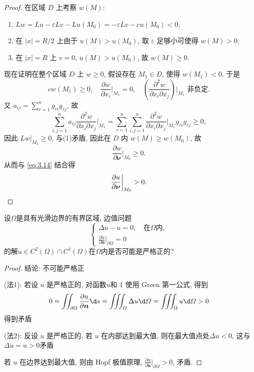 \begin{proof}
  在区域 $D$ 上考察 $w(M)$:
  \medskip
  \begin{enumerate}[(1)]
    \item $Lw=Lu-\varepsilon Lv-Lu(M_0)=-\varepsilon Lv-cu(M_0)<0$;
    \item 在 $|x| = R/2$ 上由于 $u(M)>u(M_0)$,
      取 $\varepsilon$ 足够小可使得 $w(M)>0$;
    \item 在 $|x| = R$ 上 $v=0$, $u(M)>u(M_0)$, 故 $w(M)\geq 0$.
  \end{enumerate}
  \medskip
  现在证明在整个区域 $D$ 上 $w\geq 0$, 假设存在 $M_1\in D$, 使得 $w(M_1) < 0$, 于是
  \[cw(M_1)\geq 0,\quad \frac{\partial w}{\partial x_i}\bigg|_{M_1} = 0,
    \quad\left(\frac{\partial^2w}{\partial x_i\partial x_j}\right)\bigg|_{M_1}\text{ 非负定}.\]
  又 $a_{ij}=\sum_{r=1}^n g_{ri}g_{rj}$, 故
  \[\sum_{i,j=1}^na_{ij}\frac{\partial^2w}{\partial x_i\partial x_j}
    \bigg|_{M_1}=\sum_{r=1}^n\sum_{i,j=1}^n\frac{\partial^2w}{\partial x_i\partial x_j}
    \bigg|_{M_1}g_{ri}g_{rj}\geq 0,\]
  因此 $Lw|_{M_1}\geq 0$, 与(1)矛盾, 因此在 $D$ 内 $w(M)\geq w(M_0)$, 故
  \[\frac{\partial w}{\partial\bm{\nu}}\bigg|_{M_0} \geq 0.\]
  从而与 \eqref{eq:3.14} 结合得
  \[\frac{\partial u}{\partial\bm{\nu}}\bigg|_{M_0} > 0. \qedhere\]
\end{proof}


\begin{exercise}
	设$\varOmega$是具有光滑边界的有界区域, 边值问题
	\[\begin{cases}
		\Delta u-u=0,\quad\text{在}\varOmega\text{内},\\
		\displaystyle\frac{\partial u}{\partial\bm{n}}\bigg|_{\partial\varOmega}=0
	\end{cases}\]
	的解$u\in C^2(\varOmega)\cap C^1(\varOmega)$在$\varOmega$内是否可能是严格正的?
\end{exercise}

\begin{proof}
	结论: 不可能严格正
	
	(法1): 若设 $u$ 是严格正的, 对函数$u$和 $1$ 使用 Green 第一公式, 得到
	$$0=\iint_{\partial\Omega}\frac{\partial u}{\partial\bm{n}}\d s=\iiint_\varOmega\Delta u\d\varOmega=\iiint_\Omega u\d\varOmega>0$$
	得到矛盾
	
	(法2): 反设 $u$ 是严格正的, 若 $u$ 在内部达到最大值, 则在最大值点处$\Delta u<0$, 这与$\Delta u=u>0$矛盾
	
	若 $u$ 在边界达到最大值, 则由 Hopf 极值原理, $\frac{\partial u}{\partial\bm{n}}\big|_{\partial\Omega}>0$, 矛盾.
\end{proof}


